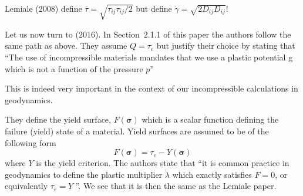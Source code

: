 \begin{remark}
Lemiale \etal (2008) define $\overline{\tau}=\sqrt{\tau_{ij}\tau_{ij}/2}$
but define $\dot{\gamma}=\sqrt{2 D_{ij}D_{ij}}$!
\end{remark}

Let us now turn to \textcite{spmw16} (2016).
In Section~2.1.1 of this paper the authors follow the same path as above. 
They assume $Q=\tau_e$ but justify their choice by stating that ``The use of incompressible materials mandates that we use a plastic potential g which is not a function of the pressure $p$''

This is indeed very important in the context of our incompressible calculations in geodynamics. 

They define the yield surface, $F(\bm\sigma)$ which is a scalar function defining the failure (yield) state of a material. Yield surfaces are
assumed to be of the following form 
\[
F(\bm\sigma) =\tau_e - Y(\bm\sigma)
\]
where $Y$ is the yield criterion.
The authors state that ``it is common practice in geodynamics to define the
plastic multiplier $\dot\lambda$ which exactly satisfies $F=0$, 
or equivalently $\tau_e=Y$ \cite{lemm08}''.
We see that it is then the same as the Lemiale \etal paper.





